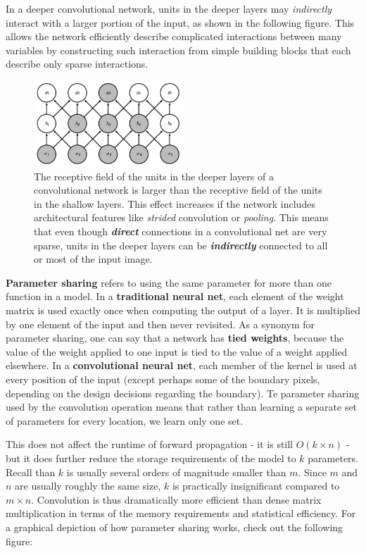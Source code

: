 \documentclass{report}
\begin{document}
In a deeper convolutional network, units in the deeper layers may \textit{indirectly} interact with a larger portion of the input, as shown in the following figure. This allows the network efficiently describe complicated interactions between many variables by constructing such interaction from simple building blocks that each describe only sparse interactions.

\begin{figure}[h!]
  \centering
  \includegraphics[width=0.5\textwidth]{Convolutional_Networks/sparse_connectivity_3.png}
  \caption{The receptive field of the units in the deeper layers of a convolutional network is larger than the receptive field of the units in the shallow layers. This effect increases if the network includes architectural features like \textit{strided} convolution or \textit{pooling}. This means that even though \textbf{\textit{direct}} connections in a convolutional net are very sparse, units in the deeper layers can be \textbf{\textit{indirectly}} connected to all or most of the input image.}
\end{figure}

\noindent \textbf{Parameter sharing} refers to using the same parameter for more than one function in a model. In a \textbf{traditional neural net}, each element of the weight matrix is used exactly once when computing the output of a layer. It is multiplied by one element of the input and then never revisited. As a synonym for parameter sharing, one can say that a network has \textbf{tied weights}, because the value of the weight applied to one input is tied to the value of a weight applied elsewhere. In a \textbf{convolutional neural net}, each member of the kernel is used at every position of the input (except perhaps some of the boundary pixels, depending on the design decisions regarding the boundary). Te parameter sharing used by the convolution operation means that rather than learning a separate set of parameters for every location, we learn only one set.

\noindent This does not affect the runtime of forward propagation - it is still $O(k \times n)$ - but it does further reduce the storage requirements of the model to $k$ parameters. Recall than $k$ is usually several orders of magnitude smaller than $m$. Since $m$ and $n$ are usually roughly the same size, $k$ is practically insignificant compared to $m \times n$. Convolution is thus dramatically more efficient than dense matrix multiplication in terms of the memory requirements and statistical efficiency. For a graphical depiction of how parameter sharing works, check out the following figure:
\end{document}
